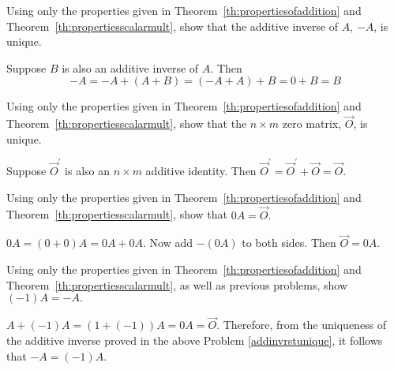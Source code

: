 \documentclass{ximera}
\begin{document}
\begin{problem}\label{prb:4.5} \label{addinvrstunique} Using only the properties given in Theorem~\ref{th:propertiesofaddition}
 and Theorem~\ref{th:propertiesscalarmult},
show that the additive inverse of $A$, $-A$, is unique.

\begin{hint}
 Suppose $B$ is also an additive inverse of $A$. Then
\[
-A=-A+\left( A+B\right) =\left( -A+A\right) +B=0+B=B
\]
\end{hint}
\end{problem}

\begin{problem}\label{prb:4.6} Using only the properties given in Theorem~\ref{th:propertiesofaddition}
 and Theorem~\ref{th:propertiesscalarmult},
show that the $n\times m$ zero matrix, $\vec{O}$, is unique.

\begin{hint}
Suppose $\vec{O}^{\prime }$ is also an $n\times m$ additive identity. Then $\vec{O}^{\prime }=\vec{O}^{\prime }+\vec{O}=\vec{O}.$
\end{hint}
\end{problem}

\begin{problem}\label{prb:4.7} Using only the properties given in Theorem~\ref{th:propertiesofaddition}
 and Theorem~\ref{th:propertiesscalarmult}, show that $0A=\vec{O}.$ 

\begin{hint}
$0A=\left( 0+0\right) A=0A+0A.$ Now add $-\left(
0A\right) $ to both sides. Then $\vec{O}=0A$.
\end{hint}
\end{problem}

\begin{problem}\label{prb:4.8} Using only the properties given in Theorem~\ref{th:propertiesofaddition}
 and Theorem~\ref{th:propertiesscalarmult}, as well as previous
problems, show $\left( -1\right) A=-A.$

\begin{hint}
$A+\left( -1\right) A=\left( 1+\left(
-1\right) \right) A=0A=\vec{O}.$ Therefore, from the uniqueness of the additive
inverse proved in the above Problem \ref{addinvrstunique}, it follows that $
-A=\left( -1\right) A$.
\end{hint}
\end{problem}
\end{document}
